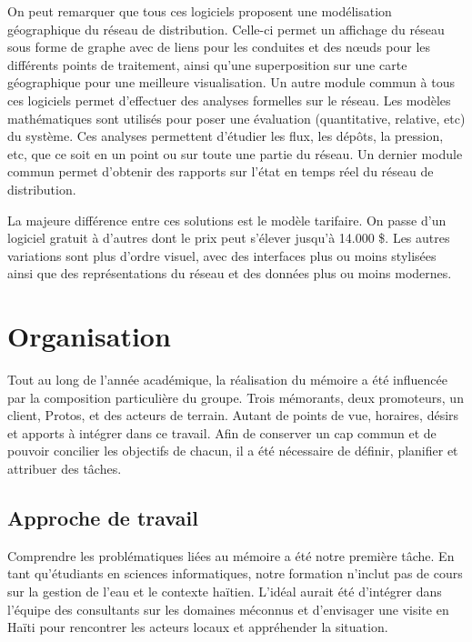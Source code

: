 \documentclass{EPL-master-thesis-covers-FR}
\begin{document}
			On peut remarquer que tous ces logiciels proposent une modélisation géographique du réseau de distribution. Celle-ci permet un affichage du réseau sous forme de graphe avec de liens pour les conduites et des nœuds pour les différents points de traitement, ainsi qu'une superposition sur une carte géographique pour une meilleure visualisation. Un autre module commun à tous ces logiciels permet d'effectuer des analyses formelles sur le réseau. Les modèles mathématiques sont utilisés pour poser une évaluation (quantitative, relative, etc) du système. Ces analyses permettent d'étudier les flux, les dépôts, la pression, etc, que ce soit en un point ou sur toute une partie du réseau. Un dernier module commun permet d'obten{}ir des rapports sur l'état en temps réel du réseau de distribution.

			La majeure différence entre ces solutions est le modèle tarifaire. On passe d'un logiciel gratuit à d'autres dont le prix peut s'élever jusqu'à 14.000 \$. Les autres variations sont plus d'ordre visuel, avec des interfaces plus ou moins stylisées ainsi que des représentations du réseau et des données plus ou moins modernes.

	\chapter{Organisation}

		Tout au long de l'année académique, la réalisation du mémoire a été influencée par la composition particulière du groupe. Trois mémorants, deux promoteurs, un client, Protos, et des acteurs de terrain. Autant de points de vue, horaires, désirs et apports à intégrer dans ce travail. Afin de conserver un cap commun et de pouvoir concilier les objectifs de chacun, il a été nécessaire de définir, planifier et attribuer des tâches. %

		\section{Approche de travail}

			Comprendre les problématiques liées au mémoire a été notre première tâche. En tant qu'étudiants en sciences informatiques, notre formation n'inclut pas de cours sur la gestion de l'eau et le contexte haïtien. L'idéal aurait été d'intégrer dans l'équipe des consultants sur les domaines méconnus et d'envisager une visite en Haïti pour rencontrer les acteurs locaux et appréhender la situation.
\end{document}
